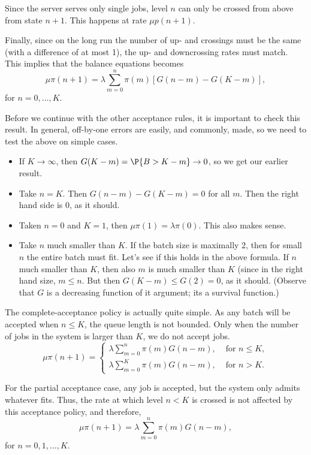 \begin{question}
\begin{solution}
  Since the server serves only single jobs, level $n$ can only be
  crossed from above from state $n+1$. This happens at rate $\mu p(n+1)$. 

  Finally, since on the long run the number of up- and crossings must
  be the same (with a difference of at most 1), the up- and
  downcrossing rates must match. This implies that the balance
  equations becomes
  \begin{equation*}
    \mu \pi(n+1) = \lambda \sum_{m=0}^n \pi(m)   [G(n-m)-G(K-m)],
  \end{equation*}
  for $n=0,\ldots, K$. 

  Before we continue with the other acceptance rules, it is important
  to check this result.  In general, off-by-one errors are easily, and
  commonly, made, so we need to test the above on simple cases. 
  \begin{itemize}
  \item  If $K\to \infty$, then $G(K-m)=\P{B>K-m}\to 0$, so we get our earlier result. 
  \item Take $n=K$. Then $G(n-m)-G(K-m)=0$ for all $m$. Then the right hand side is 0, as it should.
  \item Taken $n=0$ and $K=1$, then $\mu \pi(1)= \lambda \pi(0)$. This also makes sense. 
  \item Take $n$ much smaller than $K$. If the batch size is maximally
    $2$, then for small $n$ the entire batch must fit. Let's see if
    this holds in the above formula. If $n$ much smaller than $K$,
    then also $m$ is much smaller than $K$ (since in the right hand
    size, $m\leq n$. But then $G(K-m) \leq G(2) = 0$, as it
    should. (Observe that $G$ is a decreasing function of it argument;
    its a survival function.)
  \end{itemize}

  The complete-acceptance policy is actually quite simple. As any
  batch will be accepted when $n\leq K$, the queue length is not
  bounded.  Only when the number of jobs in the system is larger than
  $K$, we do not accept jobs. 
  \begin{equation*}
    \mu \pi(n+1) = 
    \begin{cases}
      \lambda \sum_{m=0}^n \pi(m) G(n-m), & \text{ for } n\leq K,\\
      \lambda \sum_{m=0}^K \pi(m) G(n-m), & \text{ for } n> K.
    \end{cases}
  \end{equation*}

  For the partial acceptance case, any job is accepted, but the system
  only admits whatever fits. Thus, the rate at which level $n<K$ is
  crossed is not affected by this acceptance policy, and therefore,
  \begin{equation*}
    \mu \pi(n+1) = \lambda \sum_{m=0}^n \pi(m) G(n-m), 
  \end{equation*}
  for $n=0,1,\ldots, K$. 
\end{solution}
\end{question}




